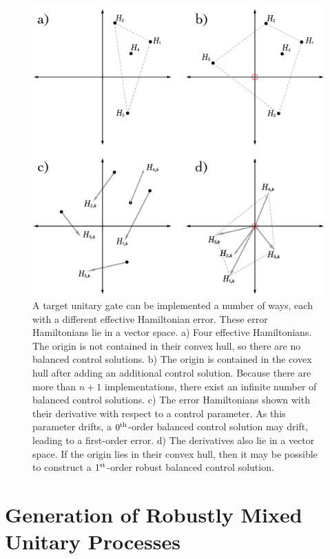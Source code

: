 \documentclass[aps,nofootinbib,pra,notitlepage,twocolumn]{revtex4-1}
\begin{document}
\begin{figure}
  \centering
  \includegraphics[width=\columnwidth]{vectorspace.pdf}
  \caption{A target unitary gate can be implemented a number of ways, each with a different effective Hamiltonian error. These error Hamiltonians lie in a vector space. a) Four effective Hamiltonians. The origin is not contained in their convex hull, so there are no balanced control solutions. b) The origin is contained in the covex hull after adding an additional control solution. Because there are more than $n+1$ implementations, there exist an infinite number of balanced control solutions. c) The error Hamiltonians shown with their derivative with respect to a control parameter. As this parameter drifts, a $0^{\rm th}$-order balanced control solution may drift, leading to a first-order error. d) The derivatives also lie in a vector space. If the origin lies in their convex hull, then it may be possible to construct a $1^{\rm{st}}$-order robust balanced control solution.}
  \label{fig:vectorspace}
\end{figure}


\section{Generation of Robustly Mixed Unitary Processes}
\label{sec:generation}
\end{document}
